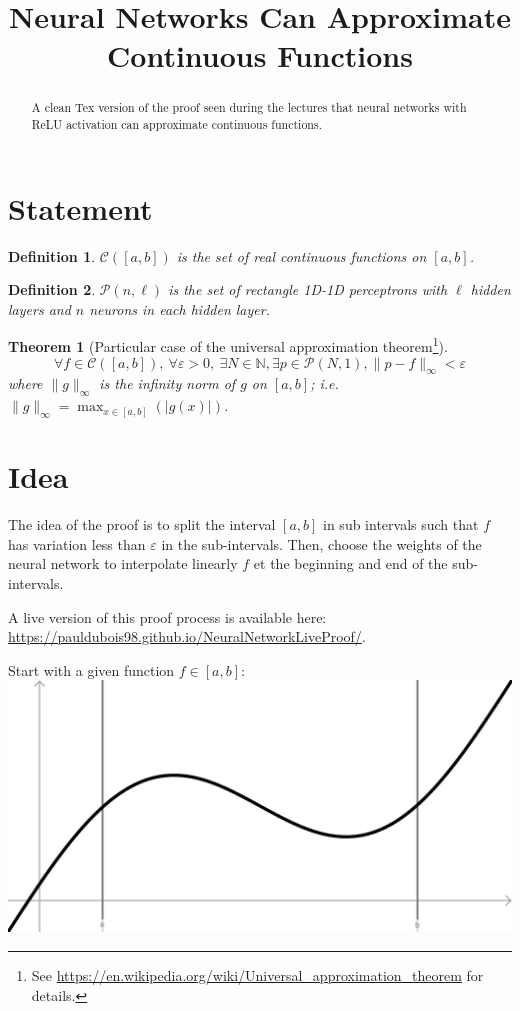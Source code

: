 \documentclass[]{article}
\title{Neural Networks Can Approximate Continuous Functions}
\date{}
\newtheorem*{theorem}{Theorem}
\newtheorem*{definition}{Definition}
\begin{document}
\maketitle

\begin{abstract}
	A clean Tex version of the proof seen during the lectures that neural networks with ReLU activation can approximate continuous functions.
\end{abstract}

\section{Statement}
\begin{definition}
	$\mathcal{C}\left( \left[ a,b \right] \right)$ is the set of real continuous functions on $\left[ a,b \right]$.
\end{definition}
\begin{definition}
	$\mathcal{P}\left( n,\ell \right)$ is the set of rectangle 1D-1D perceptrons with $\ell$ hidden layers and $n$ neurons in each hidden layer.
\end{definition}

\begin{theorem}[Particular case of the universal approximation theorem\footnote{See \url{https://en.wikipedia.org/wiki/Universal_approximation_theorem} for details.}]
	$$\forall f \in \mathcal{C}(\left[ a,b \right]), \ \forall \varepsilon > 0, \ \exists N \in \mathbb{N}, \exists p \in \mathcal{P}(N,1), \|p-f\|_\infty < \varepsilon$$
	where $\|g\|_\infty$ is the infinity norm of $g$ on $\left[ a,b \right]$; i.e. $\|g\|_\infty = \max_{x \in \left[ a,b \right]}(|g(x)|)$.
\end{theorem}


\section{Idea}
The idea of the proof is to split the interval $\left[ a,b \right]$ in sub intervals such that $f$ has variation less than $\varepsilon$ in the sub-intervals.
Then, choose the weights of the neural network to interpolate linearly $f$ et the beginning and end of the sub-intervals.

A live version of this proof process is available here:
\url{https://pauldubois98.github.io/NeuralNetworkLiveProof/}.

\newpage
Start with a given function $f \in \left[ a,b \right]$:\newline
\includegraphics[width=\linewidth]{plot_1}
\vspace{1cm}
\end{document}
